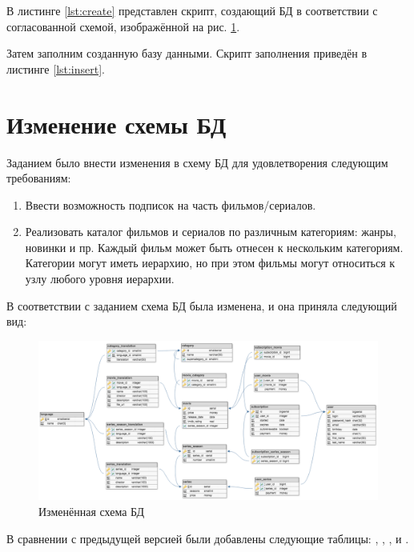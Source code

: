В листинге \ref{lst:create} представлен скрипт, создающий БД в соответствии с согласованной схемой, изображённой на рис. \ref{fig:movie-service-diagram}.



Затем заполним созданную базу данными. Скрипт заполнения приведён в листинге \ref{lst:insert}.



\section{Изменение схемы БД}

Заданием было внести изменения в схему БД для удовлетворения следующим требованиям:

\begin{enumerate}
	\item  Ввести возможность подписок на часть фильмов/сериалов.
	\item  Реализовать каталог фильмов и сериалов по различным категориям: жанры, новинки и пр. Каждый фильм может быть отнесен к нескольким категориям. Категории могут иметь иерархию, но при этом фильмы могут относиться к узлу любого уровня иерархии.
\end{enumerate}

В соответствии с заданием схема БД была изменена, и она приняла следующий вид:

\begin{figure}[H]
	\centering
	\includegraphics[width=1.0\textwidth]{diagrams/movie-service-diagram}
	\caption{Изменённая схема БД}
	\label{fig:movie-service-diagram}
\end{figure}

В сравнении с предыдущей версией были добавлены следующие таблицы: , , ,  и .

